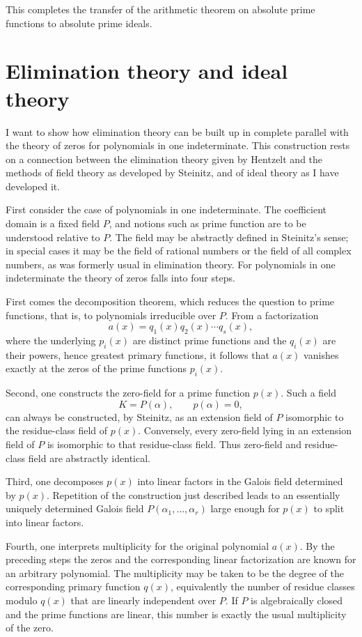 \documentclass[11pt]{article}
\begin{document}
This completes the transfer of the arithmetic theorem on absolute prime functions to absolute prime ideals.

\newpage

\section{Elimination theory and ideal theory}

I want to show how elimination theory can be built up in complete parallel with the theory of zeros for polynomials in one indeterminate. This construction rests on a connection between the elimination theory given by Hentzelt and the methods of field theory as developed by Steinitz, and of ideal theory as I have developed it.

First consider the case of polynomials in one indeterminate. The coefficient domain is a fixed field $P$, and notions such as prime function are to be understood relative to $P$. The field may be abstractly defined in Steinitz's sense; in special cases it may be the field of rational numbers or the field of all complex numbers, as was formerly usual in elimination theory. For polynomials in one indeterminate the theory of zeros falls into four steps.

First comes the decomposition theorem, which reduces the question to prime functions, that is, to polynomials irreducible over $P$. From a factorization
\[
  a(x)=q_1(x)q_2(x)\cdots q_s(x),
\]
where the underlying $p_i(x)$ are distinct prime functions and the $q_i(x)$ are their powers, hence greatest primary functions, it follows that $a(x)$ vanishes exactly at the zeros of the prime functions $p_i(x)$.

Second, one constructs the zero-field for a prime function $p(x)$. Such a field
\[
  K=P(\alpha), \qquad p(\alpha)=0,
\]
can always be constructed, by Steinitz, as an extension field of $P$ isomorphic to the residue-class field of $p(x)$. Conversely, every zero-field lying in an extension field of $P$ is isomorphic to that residue-class field. Thus zero-field and residue-class field are abstractly identical.

Third, one decomposes $p(x)$ into linear factors in the Galois field determined by $p(x)$. Repetition of the construction just described leads to an essentially uniquely determined Galois field $P(\alpha_1,\ldots,\alpha_r)$ large enough for $p(x)$ to split into linear factors.

Fourth, one interprets multiplicity for the original polynomial $a(x)$. By the preceding steps the zeros and the corresponding linear factorization are known for an arbitrary polynomial. The multiplicity may be taken to be the degree of the corresponding primary function $q(x)$, equivalently the number of residue classes modulo $q(x)$ that are linearly independent over $P$. If $P$ is algebraically closed and the prime functions are linear, this number is exactly the usual multiplicity of the zero.
\end{document}
